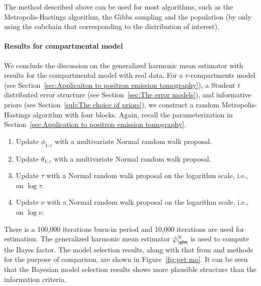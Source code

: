 The method described above can be used for most \mcmc algorithms, such as the
Metropolis-Hastings algorithm, the Gibbs sampling and the population \mcmc (by
only using the subchain that corresponding to the distribution of interest).

\paragraph{Results for \pet compartmental model}

We conclude the discussion on the generalized harmonic mean estimator with
results for the \pet compartmental model with real data. For a
$r$-compartments \pet model (see Section~\ref{sec:Applicaiton to positron
  emission tomography}), a Student $t$ distributed error structure (see
Section~\ref{sec:The error models}), and informative priors (see
Section~\ref{sub:The choice of priors}), we construct a random
Metropolis-Hastings algorithm with four blocks. Again, recall the
parameterization in Section~\ref{sec:Application to positron emission
  tomography},
\begin{enumerate}
  \item Update $\phi_{1:r}$ with a multivariate Normal random walk proposal.
  \item Update $\theta_{1:r}$ with a multivariate Normal random walk proposal.
  \item Update $\tau$ with a Normal random walk proposal on the logarithm
    scale, i.e., on $\log\tau$.
  \item Update $\nu$ with a Normal random walk proposal on the logarithm
    scale, i.e., on $\log\nu$.
\end{enumerate}
There is a 100,000 iterations burn-in period and 10,000 iterations are used
for estimation. The generalized harmonic mean estimator $\hat\varphi_{\ghm}^N$
is used to compute the Bayes factor. The model selection results, along with
that from \aic and \bic methods for the purpose of comparison, are shown in
Figure~\ref{fig:pet mo}. It can be seen that the Bayesian model selection
results shows more plausible structure than the information criteria.

